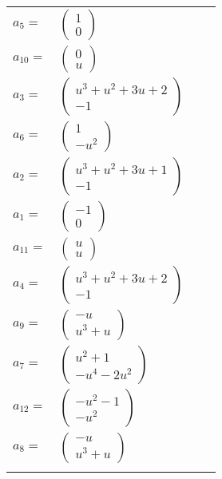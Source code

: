 \documentclass[1p]{elsarticle_modified}
\theoremstyle{definition}
\begin{document}
\begin{tabular}{m{7pt} m{180pt} m{7pt} m{180pt} }
\flushright $a_{5}=$&$\begin{pmatrix}1\\0\end{pmatrix}$ \\
\flushright $a_{10}=$&$\begin{pmatrix}0\\u\end{pmatrix}$ \\
\flushright $a_{3}=$&$\begin{pmatrix}u^3+u^2+3 u+2\\-1\end{pmatrix}$ \\
\flushright $a_{6}=$&$\begin{pmatrix}1\\- u^2\end{pmatrix}$ \\
\flushright $a_{2}=$&$\begin{pmatrix}u^3+u^2+3 u+1\\-1\end{pmatrix}$ \\
\flushright $a_{1}=$&$\begin{pmatrix}-1\\0\end{pmatrix}$ \\
\flushright $a_{11}=$&$\begin{pmatrix}u\\u\end{pmatrix}$ \\
\flushright $a_{4}=$&$\begin{pmatrix}u^3+u^2+3 u+2\\-1\end{pmatrix}$ \\
\flushright $a_{9}=$&$\begin{pmatrix}- u\\u^3+u\end{pmatrix}$ \\
\flushright $a_{7}=$&$\begin{pmatrix}u^2+1\\- u^4-2 u^2\end{pmatrix}$ \\
\flushright $a_{12}=$&$\begin{pmatrix}- u^2-1\\- u^2\end{pmatrix}$ \\
\flushright $a_{8}=$&$\begin{pmatrix}- u\\u^3+u\end{pmatrix}$\\&\end{tabular}
\end{document}
